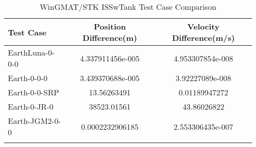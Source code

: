 \begin{table}[htbp!]
\centering
\caption{ WinGMAT/STK ISSwTank Test Case Comparison}
      \begin{tabular}{lcc}
      \hline\hline
          Test Case & Position Difference(m) & Velocity Difference(m/s) \\
         \hline
         EarthLuna-0-0-0 & 4.337911456e-005 & 4.953307854e-008 \\
         Earth-0-0-0 & 3.439370688e-005 & 3.92227089e-008 \\
         Earth-0-0-SRP & 13.56263491 & 0.01189947272 \\
         Earth-0-JR-0 & 38523.01561 & 43.86026822 \\
         Earth-JGM2-0-0 & 0.0002232906185 & 2.553306435e-007 \\
      \hline\hline
      \label{Table: ISSwTank WinGMAT-STK Table} 
\end{tabular}
\end{table}
